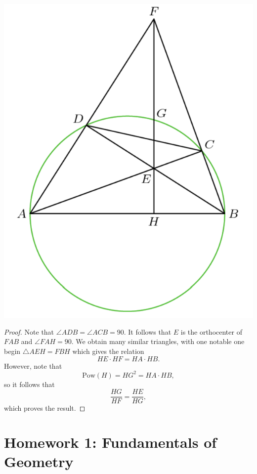 \documentclass[12pt]{scrartcl}
\newcommand{\<}{\langle}
\renewcommand{\>}{\rangle}
\begin{document}
\begin{center}
\includegraphics[scale=0.6]{graphics/p1-2.png}
\end{center}
\begin{proof}
Note that $\angle ADB = \angle ACB = 90$.  It follows that $E$ is the orthocenter of $FAB$ and $\angle FAH = 90$. We obtain many similar triangles, with one notable one begin $\triangle AEH = FBH$ which gives the relation 
$$HE \cdot HF = HA \cdot HB.$$
However, note that 
$$\text{Pow}(H) = HG^2 = HA \cdot HB,$$
so it follows that 
$$\frac{HG}{HF} = \frac{HE}{HG},$$
which proves the result.
\end{proof}
\pagebreak
\section{Homework 1: Fundamentals of Geometry}
\end{document}
